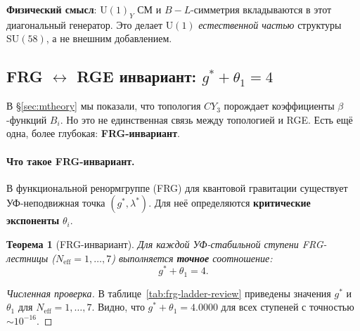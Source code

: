 \documentclass[11pt,a4paper]{article}
\newcommand{\SU}{\mathrm{SU}}
\newcommand{\CY}{CY_3}
\newtheorem{theorem}{Теорема}[section]
\theoremstyle{definition}
\begin{document}
\noindent
\textbf{Физический смысл}: $\mathrm{U}(1)_Y$ СМ и $B-L$-симметрия
вкладываются в этот диагональный генератор.
Это делает $\mathrm{U}(1)$ \emph{естественной частью} структуры
$\SU(58)$, а не внешним добавлением.
\subsection{FRG \texorpdfstring{$\leftrightarrow$}{} RGE инвариант: 
            \texorpdfstring{$g^* + \theta_1 = 4$}{g* + θ₁ = 4}}
\label{subsec:frg-rge-invariant}

В §\ref{sec:mtheory} мы показали, что топология $\CY$ порождает 
коэффициенты $\beta$-функций $B_i$. Но это не единственная связь 
между топологией и RGE. Есть ещё одна, более глубокая: 
\textbf{FRG-инвариант}.

\paragraph{Что такое FRG-инвариант.}
В функциональной ренормгруппе (FRG) для квантовой гравитации 
существует УФ-неподвижная точка $(g^*, \lambda^*)$. Для неё 
определяются \textbf{критические экспоненты} $\theta_i$.

\begin{theorem}[FRG-инвариант]
\label{thm:frg-invariant-review}
Для каждой УФ-стабильной ступени FRG-лестницы 
($N_{\text{eff}} = 1, \ldots, 7$) выполняется \textbf{точное} 
соотношение:
\begin{equation}
    \boxed{
    g^* + \theta_1 = 4.
    }
    \label{eq:frg-invariant-review}
\end{equation}
\end{theorem}

\begin{proof}[Численная проверка]
В таблице~\ref{tab:frg-ladder-review} приведены значения 
$g^*$ и $\theta_1$ для $N_{\text{eff}} = 1, \ldots, 7$. 
Видно, что $g^* + \theta_1 = 4.0000$ для всех ступеней 
с точностью $\sim 10^{-16}$.
\end{proof}
\end{document}
